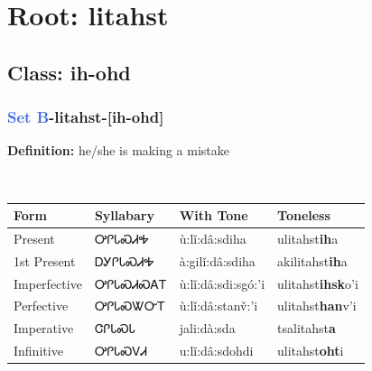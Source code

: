 \needspace{4in}
\section*{Root: litahst}
\nopagebreak
{}
\needspace{3in}
\subsection*{Class: ih-ohd}
\nopagebreak
\needspace{2in}
\subsubsection*{\textcolor{RoyalBlue}{Set B}{-}\textbf{litahst}{-}[ih-ohd]}
\nopagebreak
\textbf{Definition: } he/she is making a mistake
\\[0.5em]
\begin{tabularx}{\textwidth}{l X X X}%
\toprule%
\textbf{Form}&\textbf{Syllabary}&\textbf{With Tone}&\textbf{Toneless}\\%
\midrule%
Present&ᎤᎵᏓᏍᏗᎭ&ù:lǐ:dâ:sdiha&ulitahst\textbf{ih}a\\%
1st Present&ᎠᎩᎵᏓᏍᏗᎭ&à:gilǐ:dâ:sdiha&akilitahst\textbf{ih}a\\%
Imperfective&ᎤᎵᏓᏍᏗᏍᎪᎢ&ù:lǐ:dâ:sdi:sgó:’i&ulitahst\textbf{ihsk}o'i\\%
Perfective&ᎤᎵᏓᏍᏔᏅᎢ&ù:lǐ:dâ:stanv̌:’i&ulitahst\textbf{han}v'i\\%
Imperative&ᏣᎵᏓᏍᏓ&jali:dà:sda&tsalitahst\textbf{a}\\%
Infinitive&ᎤᎵᏓᏍᏙᏗ&u:lǐ:dâ:sdohdi&ulitahst\textbf{oht}i\\%
\bottomrule%
\end{tabularx}
\\[1em]